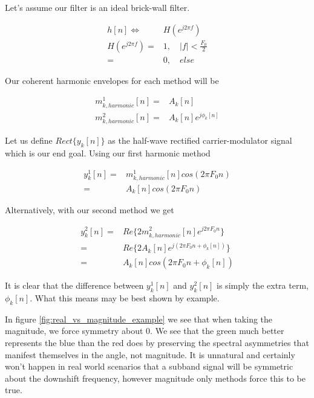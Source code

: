 \documentclass [11pt, proquest,oneside] {uwthesis}[2015/03/03]
\begin{document}
Let's assume our filter is an ideal brick-wall filter.

\begin{align}
h[n] \Longleftrightarrow& H(e^{j2\pi f}) \\
H(e^{j2\pi f}) =& 1, \quad |f| < \frac{F_0}{2} \\
=& 0, \quad else \nonumber
\end{align}

Our coherent harmonic envelopes for each method will be

\begin{align}
\label{eq:realVSmag1}
m^1_{k,harmonic}[n] =& A_k[n] \\
m^2_{k,harmonic}[n] =& A_k[n]e^{j\phi_k[n]}
\end{align}

Let us define $Rect\{y_k[n]\}$ as the half-wave rectified carrier-modulator signal which is our end goal.  Using our first harmonic method

\begin{align}
y_k^1[n] =& m^1_{k,harmonic}[n] cos(2\pi F_0 n) \\
=& A_k[n] cos(2\pi F_0 n) \nonumber
\end{align}

Alternatively, with our second method we get

\begin{align}
y_k^2[n] =& Re\{ 2m^2_{k,harmonic}[n] e^{j2\pi F_0 n} \}  \\
=& Re\{ 2A_k[n]e^{j(2\pi F_0 n + \phi_k[n])} \} \nonumber \\
=& A_k[n]cos(2\pi F_0 n + \phi_k[n]) \nonumber
\end{align}

It is clear that the difference between $y_k^1[n]$ and $y_k^2[n]$ is simply the extra term, $\phi_k[n]$.  What this means may be best shown by example.

In figure \ref{fig:real_vs_magnitude_example} we see that when taking the magnitude, we force symmetry about $0$.  We see that the green much better represents the blue than the red does by preserving the spectral asymmetries that manifest themselves in the angle, not magnitude.  It is unnatural and certainly won't happen in real world scenarios that a subband signal will be symmetric about the downshift frequency, however magnitude only methods force this to be true.
\end{document}
